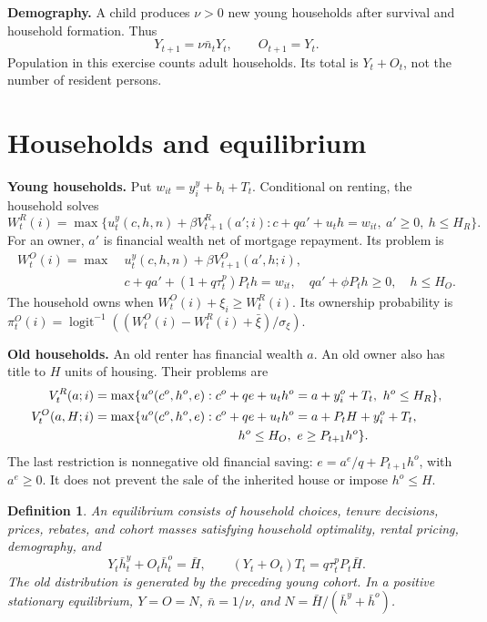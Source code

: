 \documentclass[11pt]{article}
\newtheorem{definition}{Definition}
\newcommand{\HH}{\bar H}
\newcommand{\logit}{\operatorname{logit}^{-1}}
\begin{document}
\textbf{Demography.} A child produces $\nu>0$ new young households after survival and household formation. Thus
\begin{equation}
 Y_{t+1}=\nu\bar n_tY_t,\qquad O_{t+1}=Y_t.\label{eq:demog}
\end{equation}
Population in this exercise counts adult households. Its total is $Y_t+O_t$, not the number of resident persons.

\section{Households and equilibrium}
\textbf{Young households.} Put $w_{it}=y_i^y+b_i+T_t$. Conditional on renting, the household solves
\begin{equation}
 W_t^R(i)=\max\{u_t^y(c,h,n)+\beta V_{t+1}^R(a';i):
 c+qa'+u_th=w_{it},\ a'\ge0,\ h\le H_R\}.\label{eq:youngR}
\end{equation}
For an owner, $a'$ is financial wealth net of mortgage repayment. Its problem is
\begin{equation}
\begin{split}
 W_t^O(i)=\max\ &u_t^y(c,h,n)+\beta V_{t+1}^O(a',h;i),\\
 &c+qa'+(1+q\tau_t^p)P_th=w_{it},\quad
 qa'+\phi P_th\ge0,\quad h\le H_O.\label{eq:youngO}
\end{split}
\end{equation}
The household owns when $W_t^O(i)+\xi_i\ge W_t^R(i)$. Its ownership probability is $\pi_t^O(i)=\logit((W_t^O(i)-W_t^R(i)+\bar\xi)/\sigma_\xi)$.

\textbf{Old households.} An old renter has financial wealth $a$. An old owner also has title to $H$ units of housing. Their problems are
\begin{align}
 V_t^R(a;i)&=\max\{u^o(c^o,h^o,e):c^o+qe+u_th^o=a+y_i^o+T_t,\ h^o\le H_R\},\label{eq:oldR}\\
 V_t^O(a,H;i)&=\max\{u^o(c^o,h^o,e):c^o+qe+u_th^o=a+P_tH+y_i^o+T_t,\nonumber\\
 &\hspace{40mm}h^o\le H_O,\ e\ge P_{t+1}h^o\}.\label{eq:oldO}
\end{align}
The last restriction is nonnegative old financial saving: $e=a^e/q+P_{t+1}h^o$, with $a^e\ge0$. It does not prevent the sale of the inherited house or impose $h^o\le H$.

\begin{definition}
An equilibrium consists of household choices, tenure decisions, prices, rebates, and cohort masses satisfying household optimality, rental pricing, demography, and
\begin{equation}
 Y_t\bar h_t^y+O_t\bar h_t^o=\HH,\qquad
 (Y_t+O_t)T_t=q\tau_t^pP_t\HH.\label{eq:markets}
\end{equation}
The old distribution is generated by the preceding young cohort. In a positive stationary equilibrium, $Y=O=N$, $\bar n=1/\nu$, and $N=\HH/(\bar h^y+\bar h^o)$.
\end{definition}
\end{document}
